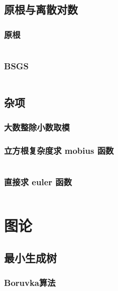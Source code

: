 \documentclass[a4paper, twoside]{article}
\begin{document}
\begin{multicols}{2}
			\subsection{原根与离散对数}
				\subsubsection{原根}
					\inputminted{cpp}{../src-midori/number/原根.cpp}
				\subsubsection{BSGS}
					\inputminted{cpp}{../src-midori/number/bsgs.cpp}
			

			\subsection{杂项}
				\subsubsection{大数整除小数取模}
					
				\subsubsection{立方根复杂度求 mobius 函数}
					\inputminted{cpp}{../src-midori/number/立方根求mu.cpp}
				\subsubsection{直接求 euler 函数}
					\inputminted{cpp}{../src-midori/number/直接求phi.cpp}

				
		\newpage
		\section{图论}

			\subsection{最小生成树}
				\subsubsection{Boruvka算法}
					
				

\end{multicols}
\end{document}
